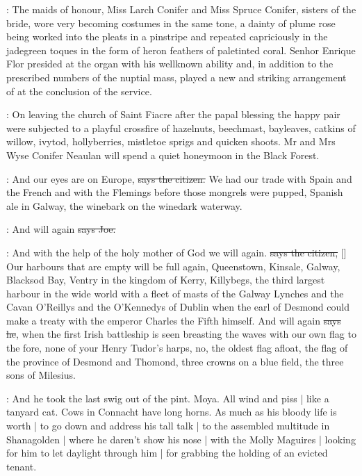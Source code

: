 :
The maids of honour,
Miss Larch Conifer and Miss Spruce Conifer,
sisters of the bride,
wore very becoming costumes in the same tone,
a dainty  of plume rose
being worked into the pleats in a pinstripe and
repeated capriciously in the jadegreen toques
in the form of heron feathers of paletinted coral.
Senhor Enrique Flor presided at the organ with his wellknown ability
and,
in addition to the prescribed
numbers of the nuptial mass,
played a new and striking arrangement of
at the conclusion of the service.

:
On leaving the church of Saint Fiacre  after the papal
blessing the happy pair were subjected to a playful crossfire
of hazelnuts,
beechmast,
bayleaves,
catkins of willow,
ivytod,
hollyberries,
mistletoe sprigs
and quicken shoots.
Mr and Mrs Wyse Conifer Neaulan
will spend a quiet honeymoon in the Black Forest.

\citizen:
And our eyes are on Europe,
\sout{says the citizen.}
We had our trade with
Spain and the French and with the Flemings before those mongrels were pupped,
Spanish ale in Galway,
the winebark on the winedark waterway.

\joe:
And will again
\sout{says Joe.}

\citizen:
And with the help of the holy mother of God
we will again.
\sout{says the citizen,}
[]
Our harbours that are empty will be full again,
Queenstown,
Kinsale,
Galway,
Blacksod Bay,
Ventry in the kingdom of Kerry,
Killybegs,
the third largest harbour in the wide world
with a fleet of masts
of the Galway Lynches
and the Cavan O'Reillys
and the O'Kennedys of Dublin
when the earl of Desmond
could make a treaty
with the emperor Charles the Fifth himself.
And will again
\sout{says he},
when the first Irish battleship is seen breasting the waves with our own flag to the fore,
none of your Henry Tudor's harps,
no,
the oldest flag afloat,
the flag of the province of Desmond and Thomond,
three crowns on a blue field,
the three sons of Milesius.%

\Nq:
And he took the last swig out of the pint.
Moya.
All wind and piss |
like a tanyard cat.
Cows in Connacht have long horns.
As much as his bloody life is worth |
to go down and address his tall talk |
to the assembled multitude in Shanagolden |
where he daren't show his nose |
with the Molly Maguires |
looking for him to let daylight through him |
for grabbing the holding of an evicted tenant.

